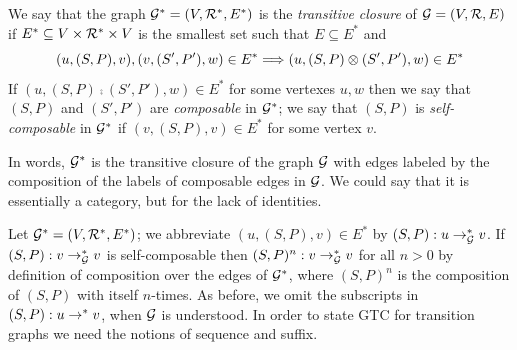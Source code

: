 \begin{definition}\label{def:transitiveClosure}
We say that  the graph $\mathcal{G}^* = (V, \mathcal{R}^*, E^*)$ is the {\em transitive closure} of $\mathcal{G} = (V, \mathcal{R}, E)$ if
$E^* \subseteq V \times \mathcal{R}^* \times V$ is the smallest set such that $E \subseteq E^*$ and
\[ (u, (S,P), v), (v, (S',P'), w) \in E^* \Longrightarrow (u, (S,P) \otimes (S',P'), w) \in E^*\]
If $(u, (S,P) \comp (S',P'), w) \in E^*$ for some vertexes $u, w$ then we say that $(S,P)$ and $(S',P')$ are {\em composable} in $\mathcal{G}^*$; we say
that $(S,P)$ is {\em self-composable} in $\mathcal{G}^*$ if $(v, (S,P), v) \in E^*$ for some vertex $v$.
\end{definition}

In words, $\mathcal{G}^*$ is the transitive closure of the graph $\mathcal{G}$ with edges labeled by the composition of the labels of composable edges in $\mathcal{G}$. 
We could say that it is essentially a category, but for the lack of identities.

Let $\mathcal{G}^* = (V, \mathcal{R}^*, E^*)$; we abbreviate $(u, (S,P), v) \in E^*$ by %
$(S,P) : u \to_{\mathcal{G}}^* v$. 
If $(S,P) : v \to_{\mathcal{G}}^* v$ is self-composable then $(S,P)^n : v \to_{\mathcal{G}}^* v$ for all $n > 0$ by definition of composition over the edges 
of $\mathcal{G}^*$, where $(S,P)^n$ is the composition of $(S,P)$ with itself $n$-times.
As before, we omit the subscripts in $(S,P) : u \to^* v$, when $\mathcal{G}$ is understood.
In order to state GTC for transition graphs we need the notions of sequence and suffix.


